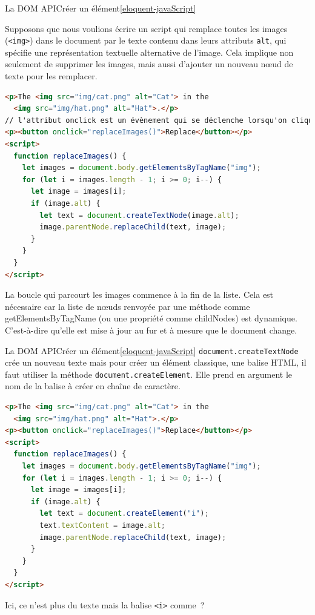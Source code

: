 \documentclass{beamer}
\begin{document}
    \begin{frame}[fragile]{La DOM API}{Créer un élément\cref{eloquent-javaScript}}
        \begin{tiny}
            Supposons que nous voulions écrire un script qui remplace toutes les images (\lstinline{<img>}) dans le document par le texte contenu dans leurs attributs \lstinline{alt}, qui spécifie une représentation textuelle alternative de l'image.
            Cela implique non seulement de supprimer les images, mais aussi d'ajouter un nouveau nœud de texte pour les remplacer.
        \end{tiny}
        \begin{lstlisting}[language=HTML,title={\tiny{HTML}},basicstyle=\tiny\ttfamily]
<p>The <img src="img/cat.png" alt="Cat"> in the
  <img src="img/hat.png" alt="Hat">.</p>
// l'attribut onclick est un évènement qui se déclenche lorsqu'on clique sur le bouton
<p><button onclick="replaceImages()">Replace</button></p>
<script>
  function replaceImages() {
    let images = document.body.getElementsByTagName("img");
    for (let i = images.length - 1; i >= 0; i--) {
      let image = images[i];
      if (image.alt) {
        let text = document.createTextNode(image.alt);
        image.parentNode.replaceChild(text, image);
      }
    }
  }
</script>
        \end{lstlisting}
        \begin{tiny}
            La boucle qui parcourt les images commence à la fin de la liste.
            Cela est nécessaire car la liste de nœuds renvoyée par une méthode comme getElementsByTagName (ou une propriété comme childNodes) est dynamique.
            C'est-à-dire qu'elle est mise à jour au fur et à mesure que le document change.
        \end{tiny}
    \end{frame}

    \begin{frame}[fragile]{La DOM API}{Créer un élément\cref{eloquent-javaScript}}
        \lstinline{document.createTextNode} crée un nouveau texte mais pour créer un élément classique, une balise HTML, il faut utiliser la méthode \lstinline{document.createElement}.
        Elle prend en argument le nom de la balise à créer en chaîne de caractère.
        \begin{lstlisting}[language=HTML,title={\tiny{HTML}},basicstyle=\tiny\ttfamily]
<p>The <img src="img/cat.png" alt="Cat"> in the
  <img src="img/hat.png" alt="Hat">.</p>
<p><button onclick="replaceImages()">Replace</button></p>
<script>
  function replaceImages() {
    let images = document.body.getElementsByTagName("img");
    for (let i = images.length - 1; i >= 0; i--) {
      let image = images[i];
      if (image.alt) {
        let text = document.createElement("i");
        text.textContent = image.alt;
        image.parentNode.replaceChild(text, image);
      }
    }
  }
</script>
        \end{lstlisting}
        Ici, ce n'est plus du texte mais la balise \lstinline{<i>} comme~?
    \end{frame}
\end{document}
